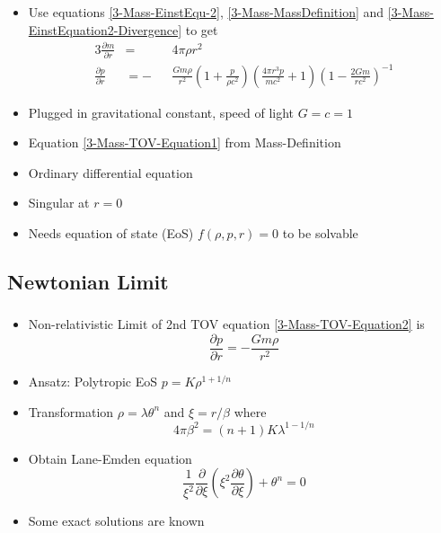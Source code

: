 \begin{frame}
	\begin{itemize}[<+->]
		\item Use equations \ref{3-Mass-EinstEqu-2}, \ref{3-Mass-MassDefinition} and \ref{3-Mass-EinstEquation2-Divergence} to get
		\begin{alignat}{3}
			\frac{\partial m}{\partial r} &= &&4\pi\rho r^2\label{3-Mass-TOV-Equation1}\\
			\frac{\partial p}{\partial r} &= -&&\frac{Gm\rho}{r^2}\left(1+\frac{p}{\rho c^2}\right)\left(\frac{4\pi r^3p}{mc^2}+1\right)\left(1-\frac{2Gm}{rc^2}\right)^{-1}\label{3-Mass-TOV-Equation2}
		\end{alignat}
		\item Plugged in gravitational constant, speed of light $G=c=1$
		\item Equation \ref{3-Mass-TOV-Equation1} from Mass-Definition
		\item Ordinary differential equation
		\item Singular at $r=0$
		\item Needs equation of state (EoS) $f(\rho,p,r)=0$ to be solvable
	\end{itemize}
\end{frame}

\subsection{Newtonian Limit}
\begin{frame}
	\frametitle{\insertsubsection}
	\begin{itemize}[<+->]
		\item Non-relativistic Limit of 2nd TOV equation \ref{3-Mass-TOV-Equation2} is
		\begin{equation}\frac{
			\partial p}{\partial r}=-\frac{Gm\rho}{r^2}
		\end{equation}
		\item Ansatz: Polytropic EoS $p=K\rho^{1+1/n}$
		\item Transformation $\rho=\lambda\theta^n$ and $\xi=r/\beta$ where
		\begin{equation}
			4\pi\beta^2=(n+1)K\lambda^{1-1/n}
		\end{equation}
		\item Obtain Lane-Emden equation \cite{laneTheoreticalTemperatureSun1870,emdenGaskugeln1907}
		\begin{equation}
			\frac{1}{\xi^2}\frac{\partial}{\partial\xi}\left(\xi^2\frac{\partial\theta}{\partial\xi}\right)+\theta^n=0
		\end{equation}
		\item Some exact solutions are known \cite{chandrasekharChandrasekharAnIntroductionStudy1958}
	\end{itemize}
\end{frame}

